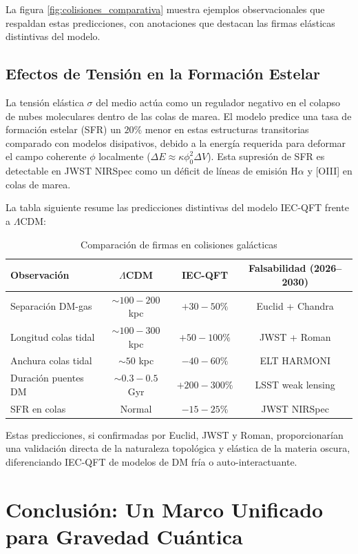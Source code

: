 \documentclass[11pt,a4paper]{article}
\begin{document}
La figura \ref{fig:colisiones_comparativa} muestra ejemplos observacionales que respaldan estas predicciones, con anotaciones que destacan las firmas elásticas distintivas del modelo.

\subsection{Efectos de Tensión en la Formación Estelar}

La tensión elástica \( \sigma \) del medio actúa como un regulador negativo en el colapso de nubes moleculares dentro de las colas de marea. El modelo predice una tasa de formación estelar (SFR) un $20\%$ menor en estas estructuras transitorias comparado con modelos disipativos, debido a la energía requerida para deformar el campo coherente \( \phi \) localmente (\( \Delta E \approx \kappa \phi_0^2 \Delta V \)). Esta supresión de SFR es detectable en JWST NIRSpec como un déficit de líneas de emisión H\( \alpha \) y [OIII] en colas de marea.

La tabla siguiente resume las predicciones distintivas del modelo IEC-QFT frente a $\Lambda$CDM:

\begin{table}[htbp]
	\centering
	\caption{Comparación de firmas en colisiones galácticas}
	\begin{tabular}{lccc}
		\toprule
		\textbf{Observación} & $\Lambda$CDM & IEC-QFT & \textbf{Falsabilidad (2026–2030)} \\
		\midrule
		Separación DM-gas & \( \sim 100-200 \) kpc & \( +30-50\% \) & Euclid + Chandra \\
		Longitud colas tidal & \( \sim 100-300 \) kpc & \( +50-100\% \) & JWST + Roman \\
		Anchura colas tidal & \( \sim 50 \) kpc & \( -40-60\% \) & ELT HARMONI \\
		Duración puentes DM & \( \sim 0.3-0.5 \) Gyr & \( +200-300\% \) & LSST weak lensing \\
		SFR en colas & Normal & \( -15-25\% \) & JWST NIRSpec \\
		\bottomrule
	\end{tabular}
	\label{tab:colisiones}
\end{table}

Estas predicciones, si confirmadas por Euclid, JWST y Roman, proporcionarían una validación directa de la naturaleza topológica y elástica de la materia oscura, diferenciando IEC-QFT de modelos de DM fría o auto-interactuante.

\section{Conclusión: Un Marco Unificado para Gravedad Cuántica}
\end{document}
